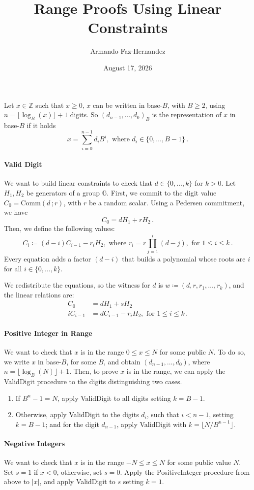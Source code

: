 \documentclass[a4paper,10pt]{article}
\title{Range Proofs Using Linear Constraints}
\author{Armando Faz-Hernandez}
\date{August 17, 2026}
\begin{document}
\maketitle
Let $x\in \mathbb{Z}$ such that $x\geq 0$,  $x$ can be written in base-$B$, with $B\geq2$, using $n=\lfloor \log_B(x)\rfloor+1$ digits. So $(d_{n-1},\dots,d_{0})_B$ is the representation of $x$ in base-$B$ if it holds
$$ x= \sum_{i=0}^{n-1} d_i B^i, \text{ where } d_i\in\{0,\dots, B-1\}\,.$$

\paragraph{Valid Digit}
We want to build linear constraints to check that $d\in\{0,\dots,k\}$ for $k>0$.
Let $H_1,H_2$ be generators of a group $\mathbb{G}$.
First, we commit to the digit value $C_0 = \text{Comm}(d\,;r)$, with $r$ be a random scalar. Using a Pedersen commitment, we have
$$ C_0 = dH_1 + rH_2\,.$$
Then, we define the following values:
$$ C_{i} \coloneq (d-i)C_{i-1} - r_i H_2, \text{ where } r_i = r\prod_{j=1}^{i} (d-j), \text{ for } 1 \leq i \leq k\,.$$
Every equation adds a factor $(d-i)$ that builds a polynomial whose roots are $i$ for all $i\in\{0,\dots,k\}$.

We redistribute the equations, so the witness for $d$ is $w\coloneq(d,r,r_1,\dots,r_k)$, and the linear relations are:
$$
\begin{aligned}
C_0      &= dH_1 + sH_2\\
iC_{i-1} &= dC_{i-1} - r_i H_2, \text{ for } 1 \leq i \leq k\,.
\end{aligned}
$$

\paragraph{Positive Integer in Range}
We want to check that $x$ is in the range $0\leq x \leq N$ for some public $N$.
To do so, we write $x$ in base-$B$, for some $B$, and obtain $(d_{n-1},\dots,d_0)$, where $n=\lfloor \log_B(N)\rfloor+1$.
Then, to prove $x$ is in the range, we can apply the ValidDigit procedure to the digits distinguishing two cases.
\begin{enumerate}
 \item If $B^n-1=N$, apply ValidDigit to all digits setting $k=B-1$.
 \item Otherwise, apply ValidDigit to the digits $d_{i}$, such that $i<n-1$, setting $k=B-1$; and for the digit $d_{n-1}$, apply ValidDigit with $k=\lfloor N/B^{n-1} \rfloor$.
\end{enumerate}

\paragraph{Negative Integers}
We want to check that $x$ is in the range $-N \leq x \leq N$ for some public value $N$.
Set $s=1$ if $x<0$, otherwise, set $s=0$.
Apply the PositiveInteger procedure from above to $|x|$, and apply ValidDigit to $s$ setting $k=1$.
\end{document}

